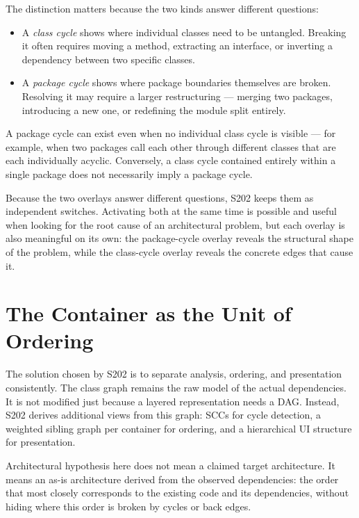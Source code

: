 \documentclass[a4paper,11pt]{article}
\begin{document}
The distinction matters because the two kinds answer different questions:

\begin{itemize}
  \item A \emph{class cycle} shows where individual classes need to be
        untangled. Breaking it often requires moving a method, extracting an
        interface, or inverting a dependency between two specific classes.
  \item A \emph{package cycle} shows where package boundaries themselves are
        broken. Resolving it may require a larger restructuring — merging two
        packages, introducing a new one, or redefining the module split
        entirely.
\end{itemize}

A package cycle can exist even when no individual class cycle is visible —
for example, when two packages call each other through different classes that
are each individually acyclic. Conversely, a class cycle contained entirely
within a single package does not necessarily imply a package cycle.

Because the two overlays answer different questions, S202 keeps them as
independent switches. Activating both at the same time is possible and useful
when looking for the root cause of an architectural problem, but each overlay
is also meaningful on its own: the package-cycle overlay reveals the
structural shape of the problem, while the class-cycle overlay reveals the
concrete edges that cause it.

\section{The Container as the Unit of Ordering}

The solution chosen by S202 is to separate analysis, ordering, and
presentation consistently. The class graph remains the raw model of the actual
dependencies. It is not modified just because a layered representation needs
a DAG. Instead, S202 derives additional views from this graph: SCCs for cycle
detection, a weighted sibling graph per container for ordering, and a
hierarchical UI structure for presentation.

Architectural hypothesis here does not mean a claimed target architecture. It
means an as-is architecture derived from the observed dependencies: the order
that most closely corresponds to the existing code and its dependencies,
without hiding where this order is broken by cycles or back edges.
\end{document}
